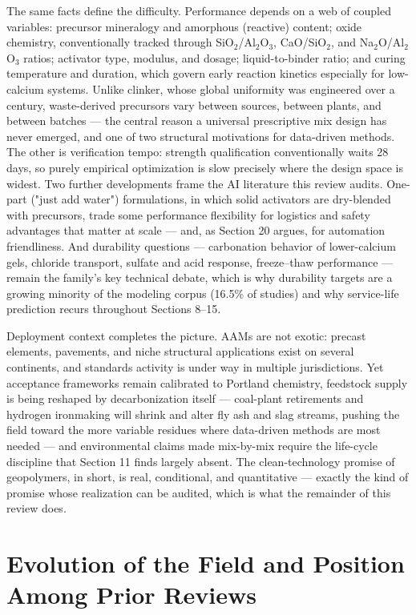 \documentclass[pdflatex,sn-basic]{sn-jnl}
\begin{document}
The same facts define the difficulty. Performance depends on a web of coupled variables: precursor mineralogy and amorphous (reactive) content; oxide chemistry, conventionally tracked through SiO$_2$/Al$_2$O$_3$, CaO/SiO$_2$, and Na$_2$O/Al$_2$O$_3$ ratios; activator type, modulus, and dosage; liquid-to-binder ratio; and curing temperature and duration, which govern early reaction kinetics especially for low-calcium systems. Unlike clinker, whose global uniformity was engineered over a century, waste-derived precursors vary between sources, between plants, and between batches --- the central reason a universal prescriptive mix design has never emerged, and one of two structural motivations for data-driven methods. The other is verification tempo: strength qualification conventionally waits 28 days, so purely empirical optimization is slow precisely where the design space is widest. Two further developments frame the AI literature this review audits. One-part ("just add water") formulations, in which solid activators are dry-blended with precursors, trade some performance flexibility for logistics and safety advantages that matter at scale --- and, as Section 20 argues, for automation friendliness. And durability questions --- carbonation behavior of lower-calcium gels, chloride transport, sulfate and acid response, freeze--thaw performance --- remain the family's key technical debate, which is why durability targets are a growing minority of the modeling corpus (16.5\% of studies) and why service-life prediction recurs throughout Sections 8--15.

Deployment context completes the picture. AAMs are not exotic: precast elements, pavements, and niche structural applications exist on several continents, and standards activity is under way in multiple jurisdictions. Yet acceptance frameworks remain calibrated to Portland chemistry, feedstock supply is being reshaped by decarbonization itself --- coal-plant retirements and hydrogen ironmaking will shrink and alter fly ash and slag streams, pushing the field toward the more variable residues where data-driven methods are most needed --- and environmental claims made mix-by-mix require the life-cycle discipline that Section 11 finds largely absent. The clean-technology promise of geopolymers, in short, is real, conditional, and quantitative --- exactly the kind of promise whose realization can be audited, which is what the remainder of this review does.

\section{Evolution of the Field and Position Among Prior Reviews}
\end{document}
